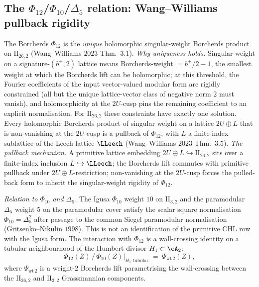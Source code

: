 \subsection{The $\Phi_{12}$/$\Phi_{10}$/$\Delta_5$ relation: Wang--Williams
pullback rigidity}
\label{wn:subsec:second-pass-wang-williams}

\begin{theorem}
\label{wn:thm:second-pass-wang-williams}

The Borcherds $\Phi_{12}$ is the \emph{unique} holomorphic singular-weight
Borcherds product on $\mathrm{II}_{26, 2}$ (Wang--Williams $2023$
Thm.~$3.1$). \emph{Why uniqueness holds.} Singular weight on a
signature-$(b^+, 2)$ lattice means Borcherds-weight $= b^+/2 - 1$,
the smallest weight at which the Borcherds lift can be holomorphic;
at this threshold, the Fourier coefficients of the input vector-valued
modular form are rigidly constrained (all but the unique lattice-vector
class of negative norm $2$ must vanish), and holomorphicity at the
$2U$-cusp pins the remaining coefficient to an explicit normalisation.
For $\mathrm{II}_{26, 2}$ these constraints have exactly one solution.
Every holomorphic Borcherds product of singular weight on
a lattice $2U \oplus L$ that is non-vanishing at the $2U$-cusp is a
pullback of $\Phi_{12}$, with $L$ a finite-index sublattice of the
Leech lattice $\LLeech$ (Wang--Williams $2023$ Thm.~$3.5$). \emph{The
pullback mechanism.} A primitive lattice embedding $2U \oplus L
\hookrightarrow \mathrm{II}_{26, 2}$ sits over a finite-index
inclusion $L \hookrightarrow \LLeech$; the Borcherds lift commutes
with primitive pullback under $2U \oplus L$-restriction; non-vanishing
at the $2U$-cusp forces the pulled-back form to inherit the
singular-weight rigidity of $\Phi_{12}$.

\emph{Relation to $\Phi_{10}$ and $\Delta_5$.} The Igusa $\Phi_{10}$
weight $10$ on $\mathrm{II}_{3, 2}$ and the paramodular $\Delta_5$
weight $5$ on the paramodular cover satisfy the scalar square
normalisation $\Phi_{10} = \Delta_5^2$ after passage to the common
Siegel paramodular normalisation (Gritsenko--Nikulin $1998$). This is
not an identification of the primitive CHL row with the Igusa form.
The interaction with $\Phi_{12}$ is a wall-crossing identity on a tubular
neighbourhood of the Humbert divisor $H_1 \subset \cA_2$:
\[
\Phi_{12}(Z) \,/\, \Phi_{10}(Z)\bigr|_{H_1\text{-tubular}}
\;=\; \Psi_{\mathrm{wt}\,2}(Z),
\]
where $\Psi_{\mathrm{wt}\,2}$ is a weight-$2$ Borcherds lift
parametrising the wall-crossing between the $\mathrm{II}_{26, 2}$ and
$\mathrm{II}_{3, 2}$ Grassmannian components.


\end{theorem}
